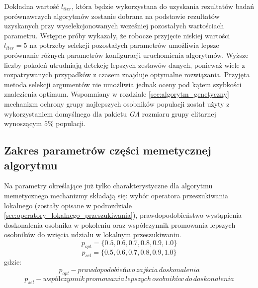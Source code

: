 \par
Dokładna wartość $l_{iter}$, która będzie wykorzystana do uzyskania rezultatów badań porównawczych algorytmów zostanie dobrana na podstawie rezultatów uzyskanych przy wyselekcjonowanych wcześniej pozostałych wartościach parametru. Wstępne próby wykazały, że robocze przyjęcie niskiej wartości $l_{iter}=5$ na potrzeby selekcji pozostałych parametrów umożliwia lepsze porównanie różnych parametrów konfiguracji uruchomienia algorytmów. Wyższe liczby pokoleń utrudniają detekcję lepszych zestawów danych, ponieważ wiele z rozpatrywanych przypadków z czasem znajduje optymalne rozwiązania. Przyjęta metoda selekcji argumentów nie umożliwia jednak oceny pod kątem szybkości znalezienia optimum. Wspomniany w rozdziale \ref{sec:algorytm_genetyczny} mechanizm ochrony grupy najlepszych osobników populacji został użyty z wykorzystaniem domyślnego dla pakietu \emph{GA} rozmiaru grupy elitarnej wynoszącym $5\%$ populacji.





\subsection{Zakres parametrów części memetycznej algorytmu}
Na parametry określające już tylko charakterystyczne dla algorytmu memetycznego mechanizmy składają się: wybór operatora przeszukiwania lokalnego (zostały opisane w podrozdziale \ref{sec:operatory_lokalnego_przeszukiwania}), prawdopodobieństwo wystąpienia doskonalenia osobnika w pokoleniu oraz współczynnik promowania lepszych osobników do wzięcia udziału w lokalnym przeszukiwaniu. 
\[p_{opt} = \lbrace0.5, 0.6, 0.7, 0.8, 0.9, 1.0\rbrace\]
\[p_{sel} = \lbrace0.5, 0.6, 0.7, 0.8, 0.9, 1.0\rbrace\]
gdzie:
\[p_{opt} - prawdopodobieńwo\,zajścia\, doskonalenia\]
\[p_{sel} - współczynnik\, promowania\, lepszych\, osobników\, do\, doskonalenia\]


